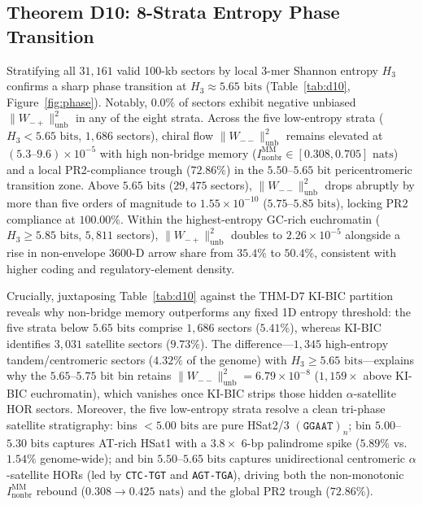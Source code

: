 \documentclass[11pt,a4paper]{article}
\newcommand{\Wmp}{W_{-+}}
\newcommand{\Wmm}{W_{--}}
\newcommand{\Inb}{I_{\mathrm{nonbr}}^{\mathrm{MM}}}
\newcommand{\Hthree}{H_3}
\begin{document}
\subsection{Theorem D10: 8-Strata Entropy Phase Transition}
Stratifying all $31{,}161$ valid 100-kb sectors by local 3-mer Shannon entropy $\Hthree$ confirms a sharp phase transition at $\Hthree \approx 5.65\text{ bits}$ (Table~\ref{tab:d10}, Figure~\ref{fig:phase}). Notably, $0.0\%$ of sectors exhibit negative unbiased $\|\Wmp\|^2_{\mathrm{unb}}$ in any of the eight strata. Across the five low-entropy strata ($\Hthree < 5.65\text{ bits}$, $1{,}686$ sectors), chiral flow $\|\Wmm\|^2_{\mathrm{unb}}$ remains elevated at $(5.3\text{--}9.6)\times 10^{-5}$ with high non-bridge memory ($\Inb \in [0.308, 0.705]\text{ nats}$) and a local PR2-compliance trough ($72.86\%$) in the $5.50\text{--}5.65\text{ bit}$ pericentromeric transition zone. Above $5.65\text{ bits}$ ($29{,}475$ sectors), $\|\Wmm\|^2_{\mathrm{unb}}$ drops abruptly by more than five orders of magnitude to $1.55\times 10^{-10}$ ($5.75\text{--}5.85\text{ bits}$), locking PR2 compliance at $100.00\%$. Within the highest-entropy GC-rich euchromatin ($\Hthree \ge 5.85\text{ bits}$, $5{,}811$ sectors), $\|\Wmp\|^2_{\mathrm{unb}}$ doubles to $2.26\times 10^{-5}$ alongside a rise in non-envelope 3600-D arrow share from $35.4\%$ to $50.4\%$, consistent with higher coding and regulatory-element density.

Crucially, juxtaposing Table~\ref{tab:d10} against the THM-D7 KI-BIC partition reveals why non-bridge memory outperforms any fixed 1D entropy threshold: the five strata below $5.65\text{ bits}$ comprise $1{,}686$ sectors ($5.41\%$), whereas KI-BIC identifies $3{,}031$ satellite sectors ($9.73\%$). The difference---$1{,}345$ high-entropy tandem/centromeric sectors ($4.32\%$ of the genome) with $\Hthree \ge 5.65\text{ bits}$---explains why the $5.65$--$5.75\text{ bit}$ bin retains $\|\Wmm\|^2_{\mathrm{unb}} = 6.79\times 10^{-8}$ ($1{,}159\times$ above KI-BIC euchromatin), which vanishes once KI-BIC strips those hidden $\alpha$-satellite HOR sectors. Moreover, the five low-entropy strata resolve a clean tri-phase satellite stratigraphy: bins $<5.00\text{ bits}$ are pure HSat2/3 $(\texttt{GGAAT})_n$; bin $5.00$--$5.30\text{ bits}$ captures AT-rich HSat1 with a $3.8\times$ 6-bp palindrome spike ($5.89\%$ vs.\ $1.54\%$ genome-wide); and bin $5.50$--$5.65\text{ bits}$ captures unidirectional centromeric $\alpha$-satellite HORs (led by \texttt{CTC-TGT} and \texttt{AGT-TGA}), driving both the non-monotonic $\Inb$ rebound ($0.308\to 0.425\text{ nats}$) and the global PR2 trough ($72.86\%$).
\end{document}
